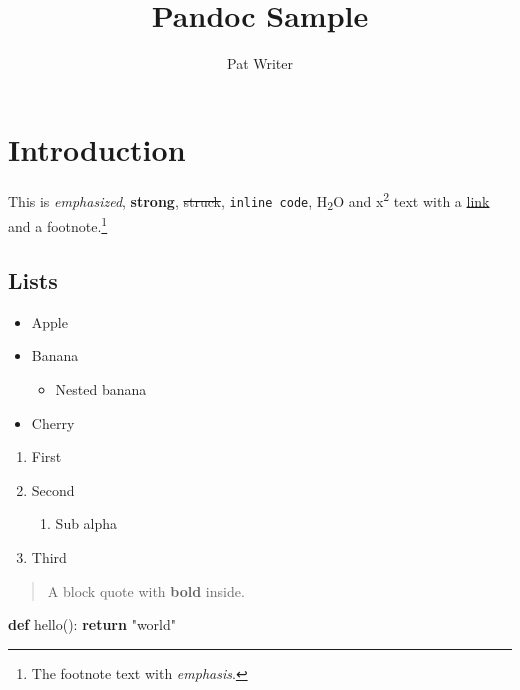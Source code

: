 \documentclass[
]{article}
\title{Pandoc Sample}
\author{Pat Writer}
\date{}
\newenvironment{Shaded}{}{}
\newcommand{\ControlFlowTok}[1]{\textcolor[rgb]{0.00,0.44,0.13}{\textbf{#1}}}
\newcommand{\KeywordTok}[1]{\textcolor[rgb]{0.00,0.44,0.13}{\textbf{#1}}}
\newcommand{\NormalTok}[1]{#1}
\newcommand{\StringTok}[1]{\textcolor[rgb]{0.25,0.44,0.63}{#1}}
\providecommand{\tightlist}{%
  \setlength{\itemsep}{0pt}\setlength{\parskip}{0pt}}
\begin{document}
\maketitle

\hypertarget{introduction}{%
\section{Introduction}\label{introduction}}

This is \emph{emphasized}, \textbf{strong}, \st{struck},
\texttt{inline\ code}, H\textsubscript{2}O and x\textsuperscript{2} text
with a \href{https://example.com/docs}{link} and a footnote.\footnote{The
  footnote text with \emph{emphasis}.}

\hypertarget{lists}{%
\subsection{Lists}\label{lists}}

\begin{itemize}
\tightlist
\item
  Apple
\item
  Banana

  \begin{itemize}
  \tightlist
  \item
    Nested banana
  \end{itemize}
\item
  Cherry
\end{itemize}

\begin{enumerate}
\def\labelenumi{\arabic{enumi}.}
\tightlist
\item
  First
\item
  Second

  \begin{enumerate}
  \def\labelenumii{\alph{enumii}.}
  \tightlist
  \item
    Sub alpha
  \end{enumerate}
\item
  Third
\end{enumerate}

\begin{quote}
A block quote with \textbf{bold} inside.
\end{quote}

\begin{Shaded}
\begin{Highlighting}[]
\KeywordTok{def}\NormalTok{ hello():}
    \ControlFlowTok{return} \StringTok{"world"}
\end{Highlighting}
\end{Shaded}
\end{document}
